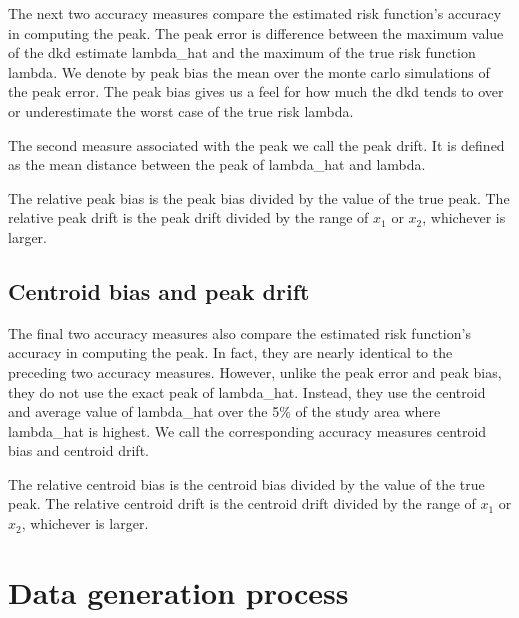 The next two accuracy measures compare the estimated risk function's accuracy in computing the peak.
The \gls{peak error} is difference between the maximum value of the \gls{dkd} estimate \gls{lambda_hat} and the maximum of the true risk function \gls{lambda}.
We denote by \gls{peak bias} the mean over the monte carlo simulations of the \gls{peak error}.
The \gls{peak bias} gives us a feel for how much the \gls{dkd} tends to over or underestimate the worst case of the true risk \gls{lambda}.

The second measure associated with the peak we call the \gls{peak drift}.
It is defined as the mean distance between the peak of \gls{lambda_hat} and \gls{lambda}.

The \gls{relative peak bias} is the \gls{peak bias} divided by the value of the true peak.
The \gls{relative peak drift} is the \gls{peak drift} divided by the range of \(x_1\) or \(x_2\), whichever is larger.

\subsection{Centroid bias and peak drift}
\label{subsec:method:centroid_bias}

The final two accuracy measures also compare the estimated risk function's accuracy in computing the peak.
In fact, they are nearly identical to the preceding two accuracy measures.
However, unlike the \gls{peak error} and \gls{peak bias}, they do not use the exact peak of \gls{lambda_hat}.
Instead, they use the centroid and average value of \gls{lambda_hat} over the 5\% of the study area where \gls{lambda_hat} is highest.
We call the corresponding accuracy measures \gls{centroid bias} and \gls{centroid drift}.

The \gls{relative centroid bias} is the \gls{centroid bias} divided by the value of the true peak.
The \gls{relative centroid drift} is the \gls{centroid drift} divided by the range of \(x_1\) or \(x_2\), whichever is larger.

\section{Data generation process}
\label{sec:method:data generation}

